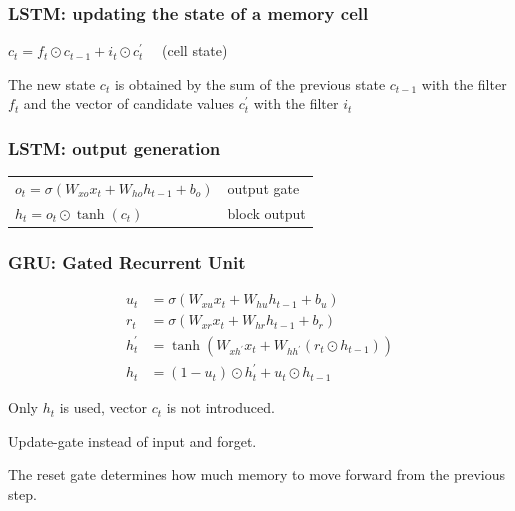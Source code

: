 \documentclass[fullscreen=true, bookmarks=true, hyperref={pdfencoding=unicode}]{beamer}
\begin{document}
\begin{frame}
  \frametitle{LSTM: updating the state of a memory cell}
    $ c_t = f_t \odot c_{t-1} + i_t \odot c_t^\prime \quad$ (cell state)

  \vspace{1cm}
The new state $c_t$ is obtained by the sum of the previous state $c_{t-1}$ with the filter $f_t$ and the vector of candidate values $c_t^\prime$ with the filter $i_t$
\end{frame}


\begin{frame}
  \frametitle{LSTM: output generation}
  \begin{tabular}{ll}
    $ o_t = \sigma(W_{xo}x_t + W_{ho}h_{t-1} + b_{o})$ & output gate \\
    $ h_t = o_t \odot \tanh(c_t)$ & block output
  \end{tabular}
\end{frame}


\begin{frame}
  \frametitle{GRU: Gated Recurrent Unit}
  \begin{align*}
      u_t &= \sigma(W_{xu}x_t + W_{hu}h_{t-1} + b_{u}) \\
      r_t &= \sigma(W_{xr}x_t + W_{hr}h_{t-1} + b_{r}) \\
      h_t^\prime &= \tanh(W_{xh^\prime}x_t + W_{hh^\prime}(r_t\odot h_{t-1})) \\
      h_t &= (1-u_t) \odot h_t^\prime + u_t \odot h_{t-1}
  \end{align*}

Only $h_t$ is used, vector $c_t$ is not introduced.

Update-gate instead of input and forget.

The reset gate determines how much memory to move forward from the previous step.
\end{frame}

\end{document}
